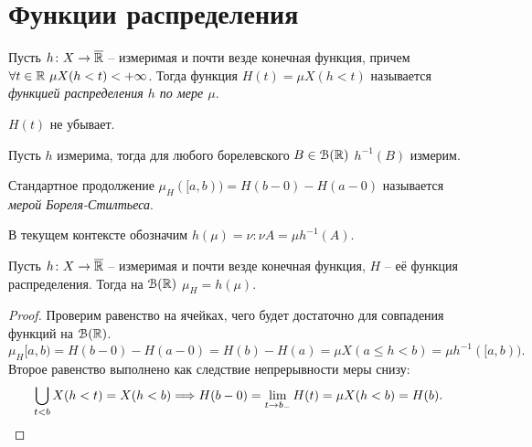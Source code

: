 \section{Функции распределения}

\begin{definition}
    Пусть $h \colon X \to \overline{\mathbb{R}}$ -- измеримая и почти везде конечная функция,
    причем $\forall t \in \mathbb{R}~ \mu X(h < t) < +\infty$. Тогда
    функция $H(t) = \mu X(h < t)$ называется \textit{функцией распределения
    $h$ по мере $\mu$}.
\end{definition}

\begin{remark}
    $H(t)$ не убывает.
\end{remark}

\begin{remark}
    Пусть $h$ измерима, тогда для любого борелевского $B \in \mathcal{B}(\mathbb{R})$ $h^{-1}(B)$ измерим.
\end{remark}

\begin{definition}
    Стандартное продолжение $\mu_H([a, b)) = H(b - 0) - H(a - 0)$
    называется \textit{мерой Бореля-Стилтьеса}.
\end{definition}

\begin{definition}
    В текущем контексте обозначим $h(\mu) = \nu\colon \nu{A} = \mu{h^{-1}(A)}$.
\end{definition}

\begin{lemma}
    Пусть $h \colon X \to \overline{\mathbb{R}}$ -- измеримая и почти везде конечная функция, $H$
    -- её функция распределения. Тогда на $\mathcal{B}(\mathbb{R})$ $\mu_H = h(\mu)$.
\end{lemma}
\begin{proof}
    Проверим равенство на ячейках, чего будет достаточно для совпадения функций на $\mathcal{B}(\mathbb{R})$.
    \[
        \mu_H{[a, b)} = H(b - 0) - H(a - 0) = H(b) - H(a) = \mu{X(a \leqslant h < b)}
        = \mu{h^{-1}([a, b))}
    .\]
    Второе равенство выполнено как следствие непрерывности меры снизу:
    \[
        \bigcup_{t < b}{X(h < t)} = X(h < b) \Longrightarrow H(b - 0) = \lim_{t \to b_-}{H(t)} = \mu{X(h < b)} = H(b) 
    .\]
\end{proof}

